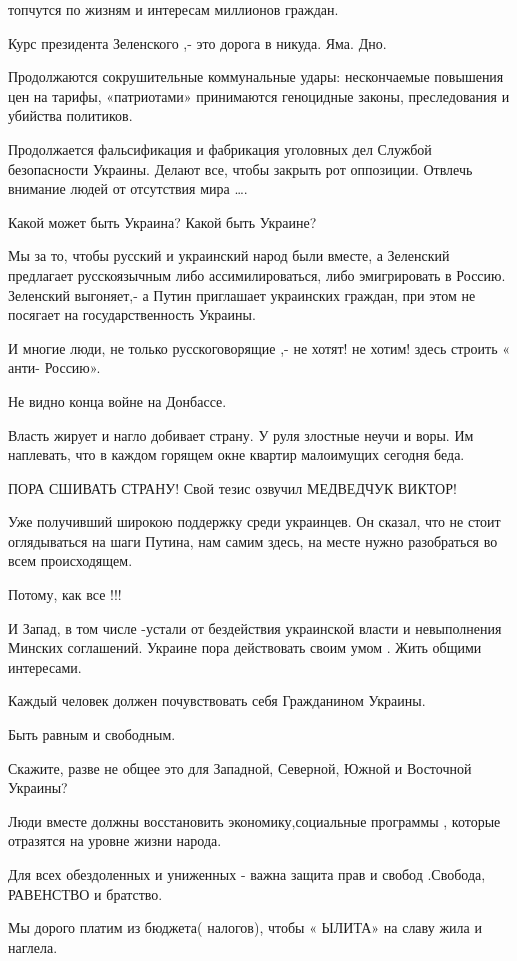 топчутся по жизням и интересам миллионов граждан. 

Курс президента Зеленского ,- это дорога в никуда. Яма. Дно.

Продолжаются  сокрушительные  коммунальные удары: нескончаемые повышения цен на
тарифы, «патриотами» принимаются геноцидные законы, преследования и убийства
политиков.  

Продолжается фальсификация и фабрикация  уголовных дел Службой безопасности
Украины. Делают все, чтобы закрыть рот оппозиции. Отвлечь внимание людей от
отсутствия мира ….

Какой может быть Украина? Какой быть Украине?

Мы за то, чтобы русский и украинский народ были вместе, а Зеленский  предлагает
русскоязычным либо ассимилироваться, либо эмигрировать в Россию.  Зеленский
выгоняет,- а Путин приглашает украинских граждан, при этом не посягает на
государственность Украины. 

И  многие люди, не только русскоговорящие ,- не хотят!  не хотим!  здесь
строить « анти- Россию».

Не видно конца войне на  Донбассе.

Власть жирует и нагло добивает страну. У руля злостные неучи и воры. Им
наплевать, что в каждом горящем окне  квартир малоимущих сегодня беда.

ПОРА СШИВАТЬ СТРАНУ! Свой тезис озвучил МЕДВЕДЧУК ВИКТОР!

Уже получивший широкою поддержку среди украинцев.  Он сказал, что не стоит
оглядываться на шаги Путина, нам самим здесь, на месте нужно разобраться во
всем происходящем. 

Потому, как все !!! 

И Запад, в том числе -устали от бездействия украинской власти и невыполнения
Минских соглашений.  Украине пора действовать своим умом . Жить общими
интересами. 

Каждый человек должен почувствовать себя Гражданином Украины. 

Быть равным и свободным.

Скажите, разве не общее  это для Западной, Северной, Южной и Восточной
Украины? 

Люди вместе должны восстановить экономику,социальные программы , которые отразятся на уровне жизни народа. 

Для всех обездоленных и униженных - важна защита прав и свобод .Свобода,
РАВЕНСТВО и братство. 

Мы дорого платим из бюджета( налогов), чтобы « ЫЛИТА» на славу жила и наглела.

